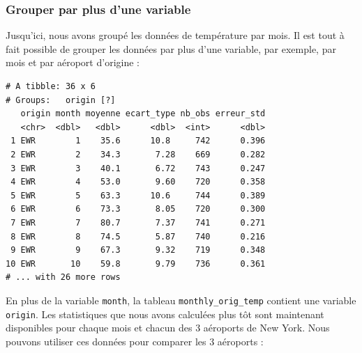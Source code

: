 \documentclass[a4paperpaper,]{article}
\newenvironment{Shaded}{\begin{snugshade}}{\end{snugshade}}
\newcommand{\DataTypeTok}[1]{\textcolor[rgb]{0.00,0.34,0.68}{#1}}
\newcommand{\KeywordTok}[1]{\textcolor[rgb]{0.12,0.11,0.11}{\textbf{#1}}}
\newcommand{\NormalTok}[1]{\textcolor[rgb]{0.12,0.11,0.11}{#1}}
\newcommand{\OperatorTok}[1]{\textcolor[rgb]{0.12,0.11,0.11}{#1}}
\newcommand{\OtherTok}[1]{\textcolor[rgb]{0.00,0.43,0.16}{#1}}
\newcommand{\StringTok}[1]{\textcolor[rgb]{0.75,0.01,0.01}{#1}}
\theoremstyle{definition}
\theoremstyle{definition}
\theoremstyle{definition}
\theoremstyle{remark}
\begin{document}
\hypertarget{grouper-par-plus-dune-variable}{%
\subsubsection{Grouper par plus d'une
variable}\label{grouper-par-plus-dune-variable}}

Jusqu'ici, nous avons groupé les données de température par mois. Il est
tout à fait possible de grouper les données par plus d'une variable, par
exemple, par mois et par aéroport d'origine :

\begin{Shaded}
\end{Shaded}

\begin{verbatim}
# A tibble: 36 x 6
# Groups:   origin [?]
   origin month moyenne ecart_type nb_obs erreur_std
   <chr>  <dbl>   <dbl>      <dbl>  <int>      <dbl>
 1 EWR        1    35.6      10.8     742      0.396
 2 EWR        2    34.3       7.28    669      0.282
 3 EWR        3    40.1       6.72    743      0.247
 4 EWR        4    53.0       9.60    720      0.358
 5 EWR        5    63.3      10.6     744      0.389
 6 EWR        6    73.3       8.05    720      0.300
 7 EWR        7    80.7       7.37    741      0.271
 8 EWR        8    74.5       5.87    740      0.216
 9 EWR        9    67.3       9.32    719      0.348
10 EWR       10    59.8       9.79    736      0.361
# ... with 26 more rows
\end{verbatim}

En plus de la variable \texttt{month}, la tableau
\texttt{monthly\_orig\_temp} contient une variable \texttt{origin}. Les
statistiques que nous avons calculées plus tôt sont maintenant
disponibles pour chaque mois et chacun des 3 aéroports de New York. Nous
pouvons utiliser ces données pour comparer les 3 aéroports :
\end{document}
